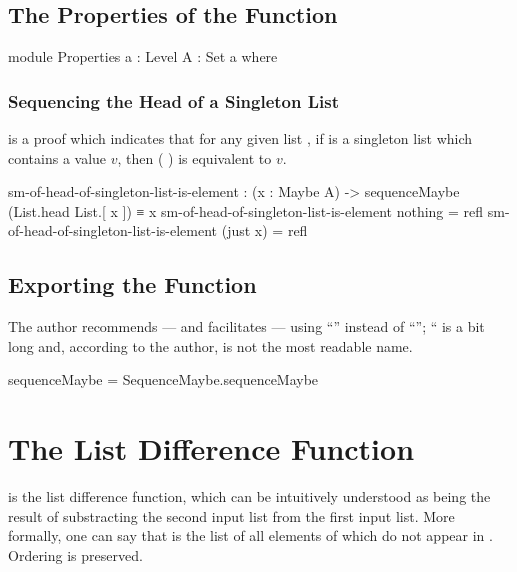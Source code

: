 \documentclass{report}
\begin{document}
\subsection{The Properties of the Function}

\begin{code}
  module Properties
    {a : Level}
    {A : Set a} where
\end{code}

\subsubsection{Sequencing the Head of a Singleton List}
 is a proof which indicates that for any given list , if  is a singleton list which contains a value \(v\), then  \AgdaSymbol( \AgdaSymbol) is equivalent to \(v\).

\begin{code}
    sm-of-head-of-singleton-list-is-element :
      (x : Maybe A) ->
      sequenceMaybe (List.head List.[ x ]) ≡ x
    sm-of-head-of-singleton-list-is-element nothing = refl
    sm-of-head-of-singleton-list-is-element (just x) = refl
\end{code}

\subsection{Exporting the Function}
The author recommends --- and facilitates --- using ``'' instead of ``''; `` is a bit long and, according to the author, is not the most readable name.

\begin{code}
sequenceMaybe = SequenceMaybe.sequenceMaybe
\end{code}

\section{The List Difference Function}
 is the list difference function, which can be intuitively understood as being the result of substracting the second input list from the first input list.  More formally, one can say that    is the list of all elements of  which do not appear in .  Ordering is preserved.
\end{document}
